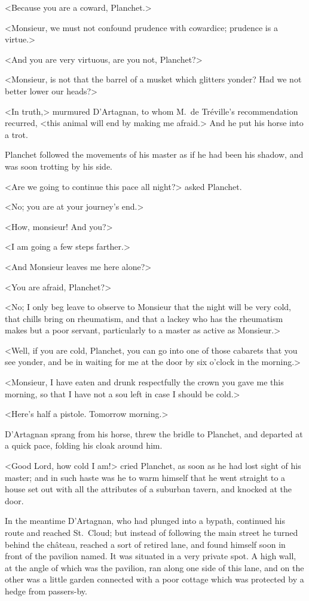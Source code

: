 <Because you are a coward, Planchet.> 

<Monsieur, we must not confound prudence with cowardice; prudence is a virtue.> 

<And you are very virtuous, are you not, Planchet?> 

<Monsieur, is not that the barrel of a musket which glitters yonder? Had we not better lower our heads?> 

<In truth,> murmured D'Artagnan, to whom M.~de Tréville's recommendation recurred, <this animal will end by making me afraid.> And he put his horse into a trot. 

Planchet followed the movements of his master as if he had been his shadow, and was soon trotting by his side. 

<Are we going to continue this pace all night?> asked Planchet. 

<No; you are at your journey's end.> 

<How, monsieur! And you?> 

<I am going a few steps farther.> 

<And Monsieur leaves me here alone?> 

<You are afraid, Planchet?> 

<No; I only beg leave to observe to Monsieur that the night will be very cold, that chills bring on rheumatism, and that a lackey who has the rheumatism makes but a poor servant, particularly to a master as active as Monsieur.> 

<Well, if you are cold, Planchet, you can go into one of those cabarets that you see yonder, and be in waiting for me at the door by six o'clock in the morning.> 

<Monsieur, I have eaten and drunk respectfully the crown you gave me this morning, so that I have not a sou left in case I should be cold.> 

<Here's half a pistole. Tomorrow morning.> 

D'Artagnan sprang from his horse, threw the bridle to Planchet, and departed at a quick pace, folding his cloak around him. 

<Good Lord, how cold I am!> cried Planchet, as soon as he had lost sight of his master; and in such haste was he to warm himself that he went straight to a house set out with all the attributes of a suburban tavern, and knocked at the door. 

In the meantime D'Artagnan, who had plunged into a bypath, continued his route and reached St.~Cloud; but instead of following the main street he turned behind the château, reached a sort of retired lane, and found himself soon in front of the pavilion named. It was situated in a very private spot. A high wall, at the angle of which was the pavilion, ran along one side of this lane, and on the other was a little garden connected with a poor cottage which was protected by a hedge from passers-by. 

